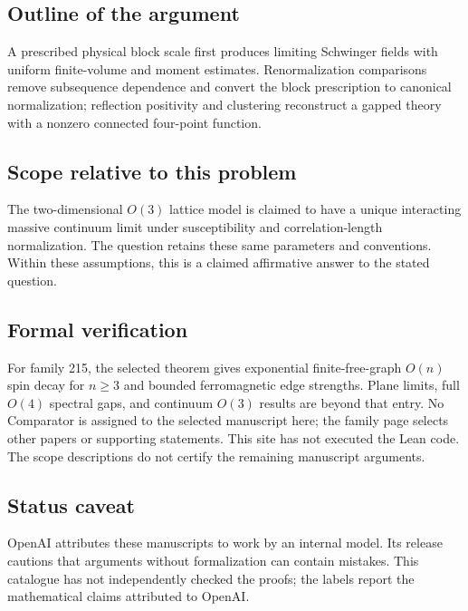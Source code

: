 \documentclass[11pt]{article}
\begin{document}
\subsection{Outline of the argument}
A prescribed physical block scale first produces limiting Schwinger fields with uniform finite-volume and moment estimates. Renormalization comparisons remove subsequence dependence and convert the block prescription to canonical normalization; reflection positivity and clustering reconstruct a gapped theory with a nonzero connected four-point function.

\subsection{Scope relative to this problem}
The two-dimensional $O(3)$ lattice model is claimed to have a unique interacting massive continuum limit under susceptibility and correlation-length normalization. The question retains these same parameters and conventions. Within these assumptions, this is a claimed affirmative answer to the stated question.

\subsection{Formal verification}
For family 215, the selected theorem gives exponential finite-free-graph $O(n)$ spin decay for $n\geq3$ and bounded ferromagnetic edge strengths. Plane limits, full $O(4)$ spectral gaps, and continuum $O(3)$ results are beyond that entry. No Comparator is assigned to the selected manuscript here; the family page selects other papers or supporting statements. This site has not executed the Lean code. The scope descriptions do not certify the remaining manuscript arguments.

\subsection{Status caveat}
OpenAI attributes these manuscripts to work by an internal model. Its release cautions that arguments without formalization can contain mistakes. This catalogue has not independently checked the proofs; the labels report the mathematical claims attributed to OpenAI.
\end{document}
